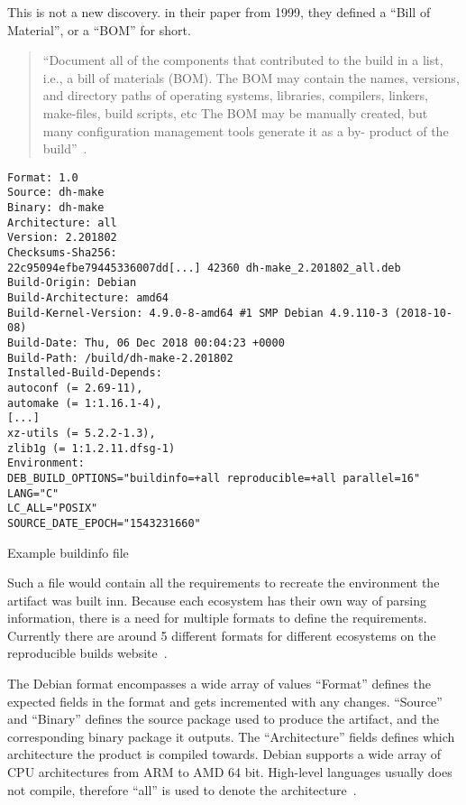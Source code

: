 \documentclass[../Main/thesis.tex]{subfiles}
\begin{document}
This is not a new discovery. \citeauthor{software-reconstruction-1999} in their
paper  from 1999, they defined a ``Bill
of Material'', or a ``BOM'' for short.

\begin{quotation}
``Document all of the components that contributed to the build in a list, i.e.,
a bill of materials (BOM). The BOM may contain the names, versions, and
directory paths of operating systems, libraries, compilers, linkers, make-files,
build scripts, etc The BOM may be manually created, but many configuration
management tools generate it as a by- product of the build''~\cite{software-reconstruction-1999}.
\end{quotation}

\begin{listing}[H]
\begin{verbatim}
Format: 1.0
Source: dh-make
Binary: dh-make
Architecture: all
Version: 2.201802
Checksums-Sha256:
22c95094efbe79445336007dd[...] 42360 dh-make_2.201802_all.deb
Build-Origin: Debian
Build-Architecture: amd64
Build-Kernel-Version: 4.9.0-8-amd64 #1 SMP Debian 4.9.110-3 (2018-10-08)
Build-Date: Thu, 06 Dec 2018 00:04:23 +0000
Build-Path: /build/dh-make-2.201802
Installed-Build-Depends:
autoconf (= 2.69-11),
automake (= 1:1.16.1-4),
[...]
xz-utils (= 5.2.2-1.3),
zlib1g (= 1:1.2.11.dfsg-1)
Environment:
DEB_BUILD_OPTIONS="buildinfo=+all reproducible=+all parallel=16"
LANG="C"
LC_ALL="POSIX"
SOURCE_DATE_EPOCH="1543231660"
\end{verbatim}
\caption{Example buildinfo file}
\label{lst:buildinfo}
\end{listing}

Such a file would contain all the requirements to recreate the environment the
artifact was built inn. Because each ecosystem has their own way of parsing
information, there is a need for multiple formats to define the requirements.
Currently there are around 5 different formats for different ecosystems on the
reproducible builds website~\cite{reproducible-builds-2019}.

The Debian format encompasses a wide array of values ``Format'' defines the
expected fields in the format and gets incremented with any changes.  ``Source''
and ``Binary'' defines the source package used to produce the artifact, and the
corresponding binary package it outputs. The ``Architecture'' fields defines
which architecture the product is compiled towards. Debian supports a wide array
of CPU architectures from ARM to AMD 64 bit. High-level languages usually does
not compile, therefore ``all'' is used to denote the
architecture~\cite{deb-buildinfo}.
\end{document}
